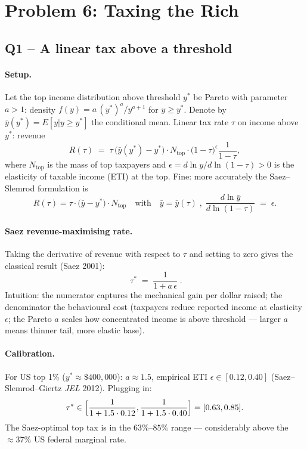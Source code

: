 \documentclass[11pt,a4paper]{article}
\begin{document}
\section*{Problem 6: Taxing the Rich}

\subsection*{Q1 -- A linear tax above a threshold}

\paragraph{Setup.}
Let the top income distribution above threshold $y^{*}$ be Pareto with parameter $a>1$: density $f(y)=a\,(y^{*})^{a}/y^{a+1}$ for $y\ge y^{*}$. Denote by $\bar y(y^{*})=E[y|y\ge y^{*}]$ the conditional mean. Linear tax rate $\tau$ on income above $y^{*}$: revenue
\begin{equation}
R(\tau)\;=\;\tau\,\bigl(\bar y(y^{*})-y^{*}\bigr)\cdot N_{\text{top}}\cdot\bigl(1-\tau\bigr)^{\epsilon}\frac{1}{1-\tau},
\label{eq:q6_R}
\end{equation}
where $N_{\text{top}}$ is the mass of top taxpayers and $\epsilon=d\ln y/d\ln(1-\tau)>0$ is the elasticity of taxable income (ETI) at the top. Fine: more accurately the Saez--Slemrod formulation is
\[
R(\tau)=\tau\cdot\bigl(\bar y-y^{*}\bigr)\cdot N_{\text{top}}\quad\text{with}\quad \bar y=\bar y(\tau)\;,\;\frac{d\ln\bar y}{d\ln(1-\tau)}\;=\;\epsilon.
\]

\paragraph{Saez revenue-maximising rate.}
Taking the derivative of revenue with respect to $\tau$ and setting to zero gives the classical result (Saez 2001):
\begin{equation}
\boxed{\;\tau^{*}\;=\;\frac{1}{1+a\,\epsilon}\;.}
\label{eq:q6_Saez}
\end{equation}
Intuition: the numerator captures the mechanical gain per dollar raised; the denominator the behavioural cost (taxpayers reduce reported income at elasticity $\epsilon$; the Pareto $a$ scales how concentrated income is above threshold --- larger $a$ means thinner tail, more elastic base).

\paragraph{Calibration.}
For US top 1\% ($y^{*}\approx\$400{,}000$): $a\approx 1.5$, empirical ETI $\epsilon\in[0.12,0.40]$ (Saez--Slemrod--Giertz \emph{JEL} 2012). Plugging in:
\[
\tau^{*}\in\Bigl[\frac{1}{1+1.5\cdot 0.12},\frac{1}{1+1.5\cdot 0.40}\Bigr]=[0.63,0.85].
\]
The Saez-optimal top tax is in the $63\%$--$85\%$ range --- considerably above the $\approx 37\%$ US federal marginal rate.
\end{document}
